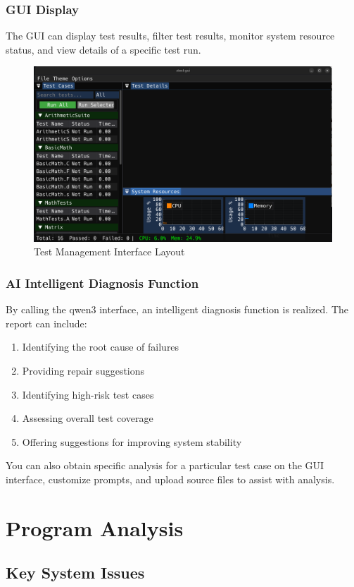 \documentclass{article}
\begin{document}
\subsubsection{GUI Display}
The GUI can display test results, filter test results, monitor system resource status, and view details of a specific test run.
\begin{figure}[H]
    \centering
    \includegraphics[width=\textwidth]{img/gui.png}
    \caption{Test Management Interface Layout}
    \label{fig:gui}
    \small
\end{figure}
\subsubsection{AI Intelligent Diagnosis Function}
By calling the qwen3 interface, an intelligent diagnosis function is realized. The report can include:
\begin{enumerate}
    \item Identifying the root cause of failures
    \item Providing repair suggestions
    \item Identifying high-risk test cases
    \item Assessing overall test coverage
    \item Offering suggestions for improving system stability
\end{enumerate}

You can also obtain specific analysis for a particular test case on the GUI interface, customize prompts, and upload source files to assist with analysis.
\newpage
\section{Program Analysis}
\subsection{Key System Issues}
\end{document}
